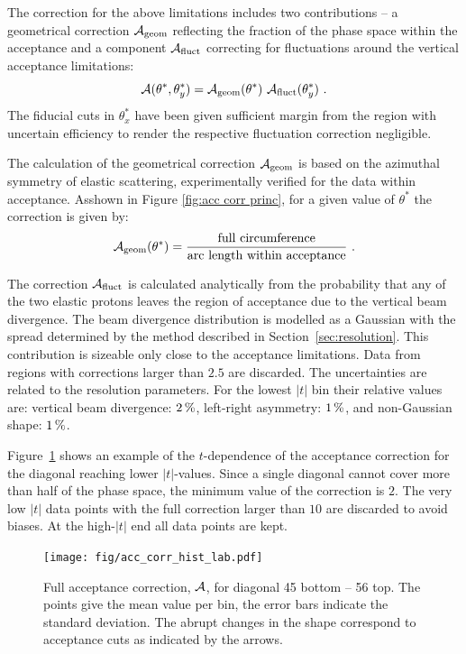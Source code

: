 The correction for the above limitations includes two contributions -- a geometrical correction ${\cal A}_{\rm geom}$ reflecting the fraction of the phase space within the acceptance and a component ${\cal A}_{\rm fluct}$ correcting for fluctuations around the vertical acceptance limitations:
\begin{equation}
{\cal A}(\theta^*, \theta_y^*) = {\cal A}_{\rm geom}(\theta^*)\ {\cal A}_{\rm fluct}(\theta_y^*)\ .
\end{equation}
The fiducial cuts in $\theta_x^*$ have been given sufficient margin from the region with uncertain efficiency to render the respective fluctuation correction negligible.

The calculation of the geometrical correction ${\cal A}_{\rm geom}$ is based on the azimuthal symmetry of elastic scattering, experimentally verified for the data within acceptance. As\Break shown in Figure \ref{fig:acc corr princ}, for a given value of $\theta^*$ the correction is given by:
\begin{equation}
\label{eq:acc geom}
{\cal A_{\rm geom}}(\theta^*) = {
	\hbox{full circumference}\over 
	\hbox{arc length within acceptance}
} \ .
\end{equation}

The correction ${\cal A}_{\rm fluct}$ is calculated analytically from the probability that any of the two elastic protons leaves the region of acceptance due to the vertical beam divergence. The beam divergence distribution is modelled as a Gaussian with the spread determined by the method described in Section~\ref{sec:resolution}. This contribution is sizeable only close to the acceptance limitations. Data from regions with corrections larger than $2.5$ are discarded. The uncertainties are related to the resolution parameters. For the lowest $|t|$ bin their relative values are: vertical beam divergence: $2\,{\rm \%}$, left-right asymmetry: $1\,{\rm \%}$, and non-Gaussian shape: $1\,{\rm \%}$.

Figure~\ref{fig:acc corr res} shows an example of the $t$-dependence of the acceptance correction for the diagonal reaching lower $|t|$-values. Since a single diagonal cannot cover more than half of the phase space, the minimum value of the correction is $2$. The very low $|t|$ data points with the full correction larger than $10$ are discarded to avoid biases. At the high-$|t|$ end all data points are kept.

\begin{figure}
\begin{center}
\texttt{[image: fig/acc\_corr\_hist\_lab.pdf]}
\caption{%
Full acceptance correction, ${\cal A}$, for diagonal 45 bottom -- 56 top. The points give the mean value per bin, the error bars indicate the standard deviation. The abrupt changes in the shape correspond to acceptance cuts as indicated by the arrows.
}
\label{fig:acc corr res}
\end{center}
\end{figure}



